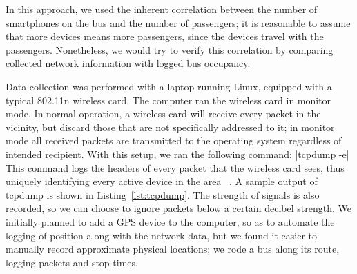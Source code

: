 
In this approach, we used the inherent correlation between the number of smartphones on the bus and the number of passengers; it is reasonable to assume that more devices means more passengers, since the devices travel with the passengers.
Nonetheless, we would try to verify this correlation by comparing collected network information with logged bus occupancy.

Data collection was performed with a laptop running Linux, equipped with a typical 802.11n wireless card.
The computer ran the wireless card in monitor mode.
In normal operation, a wireless card will receive every packet in the vicinity, but discard those that are not specifically addressed to it; in monitor mode all received packets are transmitted to the operating system regardless of intended recipient. With this setup, we ran the following command:
|tcpdump -e|
This command logs the headers of every packet that the wireless card sees, thus uniquely identifying every active device in the area ~\cite{tcpdump}.
A sample output of tcpdump is shown in Listing~\ref{lst:tcpdump}.
The strength of signals is also recorded, so we can choose to ignore packets below a certain decibel strength.
We initially planned to add a GPS device to the computer, so as to automate the logging of position along with the network data, but we found it easier to manually record approximate physical locations; we rode a bus along its route, logging packets and stop times.
